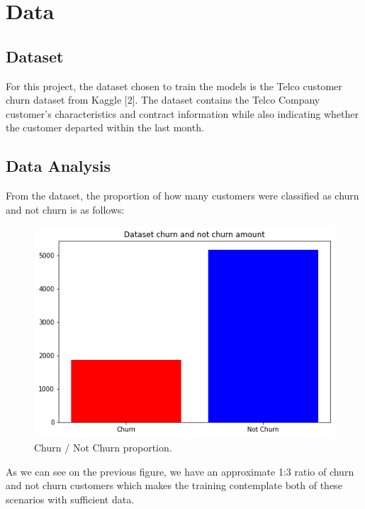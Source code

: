 \documentclass[letterpaper, 10 pt, conference]{ieeeconf}
\begin{document}
\section{ Data }
\subsection{ Dataset }
For this project, the dataset chosen to train the models is the Telco customer churn dataset from Kaggle [2]. The dataset contains the Telco Company
customer's characteristics and contract information while also indicating whether the customer departed within the last month.

\subsection{ Data Analysis}

From the dataset, the proportion of how many customers were classified as churn and not churn is as follows:

\begin{figure}[thpb]
    \centering
    \includegraphics[scale=0.3]{figures/churn_propotion.png}
    \caption{Churn / Not Churn proportion.}
    \label{churnProportion}
 \end{figure}

As we can see on the previous figure, we have an approximate 1:3 ratio of churn and not churn customers which makes the training
contemplate both of these scenarios with sufficient data.
\end{document}
